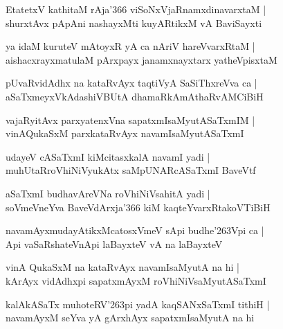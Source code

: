 \begin{shloka}
EtatetxV kathitaM rAja\char'366 viSoNxVjaRnamxdinavarxtaM |\\
shurxtAvx pApAni nashayxMti kuyARtikxM vA BaviSayxti
\end{shloka}

\begin{shloka}
ya idaM kuruteV mAtoyxR yA ca nAriV hareVvarxRtaM |\\
aishacxrayxmatulaM pArxpayx janamxnayxtarx yatheVpisxtaM
\end{shloka}

\begin{shloka}
pUvaRvidAdhx na kataRvAyx taqtiVyA SaSiThxreVva ca |\\
aSaTxmeyxVkAdashiVBUtA dhamaRkAmAthaRvAMCiBiH
\end{shloka}

\begin{shloka}
vajaRyitAvx parxyatenxVna sapatxmIsaMyutASaTxmIM |\\
vinAQukaSxM parxkataRvAyx navamIsaMyutASaTxmI
\end{shloka}

\begin{shloka}
udayeV cASaTxmI kiMcitasxkalA navamI yadi |\\
muhUtaRroVhiNiVyukAtx saMpUNARcASaTxmI BaveVtf
\end{shloka}

\begin{shloka}
aSaTxmI budhavAreVNa roVhiNiVsahitA yadi |\\
soVmeVneYva BaveVdArxja\char'366 kiM kaqteYvarxRtakoVTiBiH
\end{shloka}

\begin{shloka}
navamAyxmudayAtikxMcatosxVmeV sApi budhe\char'263Vpi ca |\\
Api vaSaRshateVnApi laBayxteV vA na laBayxteV
\end{shloka}

\begin{shloka}
vinA QukaSxM na kataRvAyx navamIsaMyutA na hi |\\
kArAyx vidAdhxpi sapatxmAyxM roVhiNiVsaMyutASaTxmI
\end{shloka}

\begin{shloka}
kalAkASaTx muhoteRV\char'263pi yadA kaqSANxSaTxmI tithiH |\\
navamAyxM seYva yA gArxhAyx sapatxmIsaMyutA na hi
\end{shloka}

